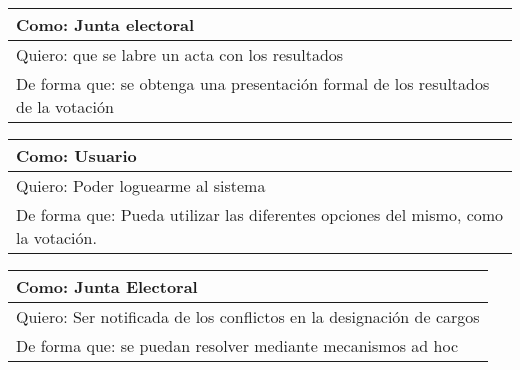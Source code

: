 \bigskip

\begin{tabular}{|l|}
\hline
Como: Junta electoral\\
\hline
Quiero: que se labre un acta con los resultados\\
\hline
De forma que: se obtenga una presentaci\'on formal de los resultados de la votaci\'on \\
\hline
\end{tabular}


\bigskip

\begin{tabular}{|l|}
\hline
Como: Usuario\\
\hline
Quiero: Poder loguearme al sistema\\
\hline
De forma que: Pueda utilizar las diferentes opciones del mismo, como la votaci\'on. \\
\hline
\end{tabular}


\bigskip

\begin{tabular}{|l|}
\hline
Como: Junta Electoral\\
\hline
Quiero: Ser notificada de los conflictos en la designaci\'on de cargos\\
\hline
De forma que: se puedan resolver mediante mecanismos ad hoc \\
\hline
\end{tabular}
